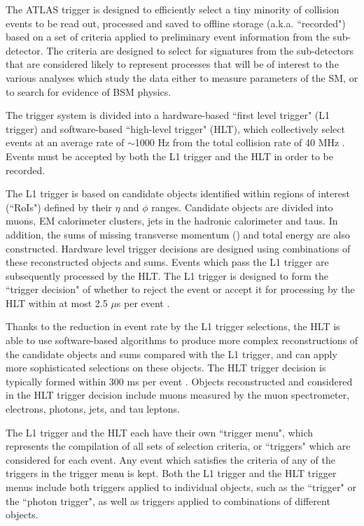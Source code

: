 The ATLAS trigger \cite{ATLAS_Trigger} is designed to efficiently select a tiny minority of collision events to be read out, processed and saved to offline storage (a.k.a. ``recorded") based on a set of criteria applied to preliminary event information from the sub-detector. The criteria are designed to select for signatures from the sub-detectors that are considered likely to represent processes that will be of interest to the various analyses which study the data either to measure parameters of the SM, or to search for evidence of BSM physics.

The trigger system is divided into a hardware-based ``first level trigger" (L1 trigger) and software-based ``high-level trigger" (HLT), which collectively select events at an average rate of $\sim$1000 Hz from the total collision rate of 40 MHz \cite{ATLAS_Trigger}. Events must be accepted by both the L1 trigger and the HLT in order to be recorded.

The L1 trigger is based on candidate objects identified within regions of interest (``RoIs") defined by their $\eta$ and $\phi$ ranges. Candidate objects are divided into muons, EM calorimeter clusters, jets in the hadronic calorimeter and taus. In addition, the sums of missing transverse momentum (\met) and total energy are also constructed. Hardware level trigger decisions are designed using combinations of these reconstructed objects and sums. Events which pass the L1 trigger are subsequently processed by the HLT. The L1 trigger is designed to form the ``trigger decision" of whether to reject the event or accept it for processing by the HLT within at most 2.5 $\mu$s per event \cite{ATLAS_Trigger}. 

Thanks to the reduction in event rate by the L1 trigger selections, the HLT is able to use software-based algorithms to produce more complex reconstructions of the candidate objects and sums compared with the L1 trigger, and can apply more sophisticated selections on these objects. The HLT trigger decision is typically formed within 300 ms per event \cite{ATLAS_Trigger}. Objects reconstructed and considered in the HLT trigger decision include muons measured by the muon spectrometer, electrons, photons, jets, \met and tau leptons. 

The L1 trigger and the HLT each have their own ``trigger menu", which represents the compilation of all sets of selection criteria, or ``triggers" which are considered for each event. Any event which satisfies the criteria of any of the triggers in the trigger menu is kept. Both the L1 trigger and the HLT trigger menus include both triggers applied to individual objects, such as the ``\met trigger" or the ``photon trigger", as well as triggers applied to combinations of different objects.

